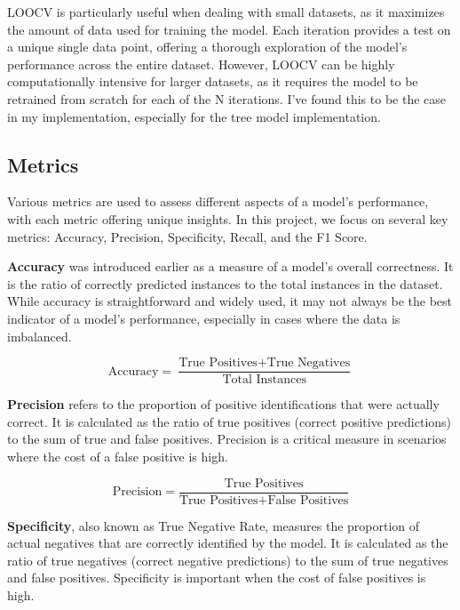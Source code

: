 \documentclass[letterpaper,10pt]{article}
\begin{document}
LOOCV is particularly useful when dealing with small datasets, as it maximizes the amount of data used for training the model. Each iteration provides a test on a unique single data point, offering a thorough exploration of the model's performance across the entire dataset. However, LOOCV can be highly computationally intensive for larger datasets, as it requires the model to be retrained from scratch for each of the N iterations. I've found this to be the case in my implementation, especially for the tree model implementation.



\subsection{Metrics} \label{withinscopefinish}

Various metrics are used to assess different aspects of a model's performance, with each metric offering unique insights. In this project, we focus on several key metrics: Accuracy, Precision, Specificity, Recall, and the F1 Score. \par

\textbf{Accuracy} was introduced earlier as a measure of a model's overall correctness. It is the ratio of correctly predicted instances to the total instances in the dataset. While accuracy is straightforward and widely used, it may not always be the best indicator of a model's performance, especially in cases where the data is imbalanced. \par

\[ \text{Accuracy} = \frac{\text{True Positives} + \text{True Negatives}}{\text{Total Instances}} \]

\textbf{Precision} refers to the proportion of positive identifications that were actually correct. It is calculated as the ratio of true positives (correct positive predictions) to the sum of true and false positives. Precision is a critical measure in scenarios where the cost of a false positive is high. \par

\[ \text{Precision} = \frac{\text{True Positives}}{\text{True Positives} + \text{False Positives}} \]

\textbf{Specificity}, also known as True Negative Rate, measures the proportion of actual negatives that are correctly identified by the model. It is calculated as the ratio of true negatives (correct negative predictions) to the sum of true negatives and false positives. Specificity is important when the cost of false positives is high. \par
\end{document}
